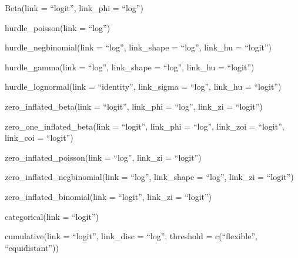 \documentclass[]{book}
\begin{document}
Beta(link = ``logit'', link\_phi = ``log'')

hurdle\_poisson(link = ``log'')

hurdle\_negbinomial(link = ``log'', link\_shape = ``log'', link\_hu =
``logit'')

hurdle\_gamma(link = ``log'', link\_shape = ``log'', link\_hu =
``logit'')

hurdle\_lognormal(link = ``identity'', link\_sigma = ``log'', link\_hu =
``logit'')

zero\_inflated\_beta(link = ``logit'', link\_phi = ``log'', link\_zi =
``logit'')

zero\_one\_inflated\_beta(link = ``logit'', link\_phi = ``log'',
link\_zoi = ``logit'', link\_coi = ``logit'')

zero\_inflated\_poisson(link = ``log'', link\_zi = ``logit'')

zero\_inflated\_negbinomial(link = ``log'', link\_shape = ``log'',
link\_zi = ``logit'')

zero\_inflated\_binomial(link = ``logit'', link\_zi = ``logit'')

categorical(link = ``logit'')

cumulative(link = ``logit'', link\_disc = ``log'', threshold =
c(``flexible'', ``equidistant''))
\end{document}
